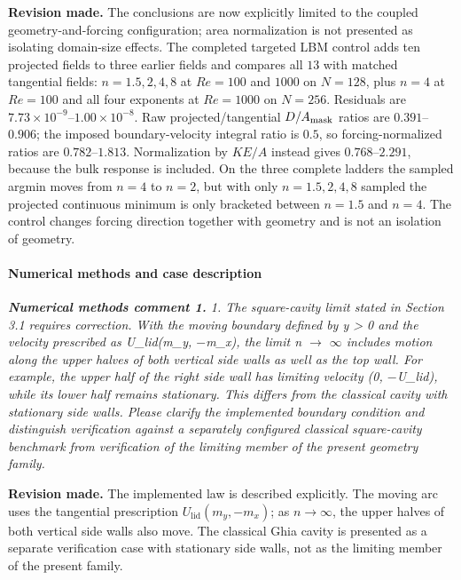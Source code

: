 \documentclass[11pt,a4paper]{article}
\newcommand{\qcomment}[1]{\textcolor{deepblue}{\itshape #1}}
\newcommand{\revwork}[1]{\textbf{\textcolor{revgreen}{#1}}}
\begin{document}
\noindent\revwork{Revision made.} The conclusions are now explicitly limited to the coupled geometry-and-forcing configuration; area normalization is not presented as isolating domain-size effects. The completed targeted LBM control adds ten projected fields to three earlier fields and compares all $13$ with matched tangential fields: $n=1.5,2,4,8$ at $Re=100$ and $1000$ on $N=128$, plus $n=4$ at $Re=100$ and all four exponents at $Re=1000$ on $N=256$. Residuals are $7.73\times10^{-9}$--$1.00\times10^{-8}$. Raw projected/tangential $D/A_{\rm mask}$ ratios are $0.391$--$0.906$; the imposed boundary-velocity integral ratio is $0.5$, so forcing-normalized ratios are $0.782$--$1.813$. Normalization by $KE/A$ instead gives $0.768$--$2.291$, because the bulk response is included. On the three complete ladders the sampled argmin moves from $n=4$ to $n=2$, but with only $n=1.5,2,4,8$ sampled the projected continuous minimum is only bracketed between $n=1.5$ and $n=4$. The control changes forcing direction together with geometry and is not an isolation of geometry.

\medskip
\paragraph{Numerical methods and case description}

\medskip
\noindent\qcomment{\textbf{Numerical methods comment 1.} 1. The square-cavity limit stated in Section 3.1 requires correction. With the moving boundary defined by y > 0 and the velocity prescribed as U\_lid(m\_y, $-$m\_x), the limit n $\to$ $\infty$ includes motion along the upper halves of both vertical side walls as well as the top wall. For example, the upper half of the right side wall has limiting velocity (0, $-$U\_lid), while its lower half remains stationary. This differs from the classical cavity with stationary side walls. Please clarify the implemented boundary condition and distinguish verification against a separately configured classical square-cavity benchmark from verification of the limiting member of the present geometry family.}

\noindent\revwork{Revision made.} The implemented law is described explicitly. The moving arc uses the tangential prescription $U_{\mathrm{lid}}(m_y,-m_x)$; as $n\to\infty$, the upper halves of both vertical side walls also move. The classical Ghia cavity is presented as a separate verification case with stationary side walls, not as the limiting member of the present family.
\end{document}

